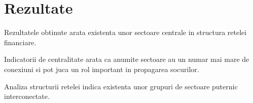 \chapter{Rezultate}

Rezultatele obtinute arata existenta unor sectoare centrale in structura retelei financiare.

Indicatorii de centralitate arata ca anumite sectoare au un numar mai mare de conexiuni si pot juca un rol important in propagarea socurilor.

Analiza structurii retelei indica existenta unor grupuri de sectoare puternic interconectate.